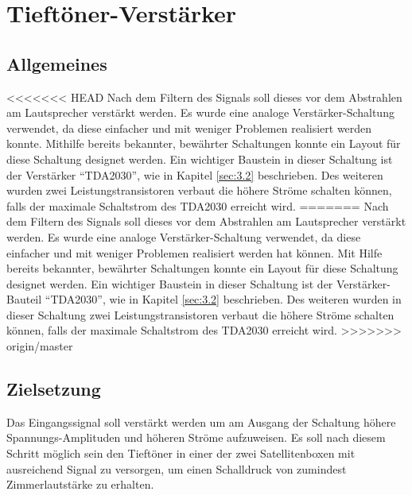 \null\newpage
\section{Tieftöner-Verstärker}\label{sec:5.3}
\subsection{Allgemeines}\label{subsec:5.3.1}
<<<<<<< HEAD
Nach dem Filtern des Signals soll dieses vor dem Abstrahlen am Lautsprecher verstärkt werden. Es wurde eine analoge Verstärker-Schaltung verwendet, da diese einfacher und mit weniger Problemen realisiert werden konnte. Mithilfe bereits bekannter, bewährter Schaltungen konnte ein Layout für diese Schaltung designet werden. Ein wichtiger Baustein in dieser Schaltung ist der Verstärker \enquote{TDA2030}, wie in Kapitel \ref{sec:3.2} beschrieben.  Des weiteren wurden zwei Leistungstransistoren verbaut die höhere Ströme schalten können, falls der maximale Schaltstrom des TDA2030 erreicht wird.
=======
Nach dem Filtern des Signals soll dieses vor dem Abstrahlen am Lautsprecher verstärkt werden. Es wurde eine analoge Verstärker-Schaltung verwendet, da diese einfacher und mit weniger Problemen realisiert werden hat können. Mit Hilfe bereits bekannter, bewährter Schaltungen konnte ein Layout für diese Schaltung designet werden. Ein wichtiger Baustein in dieser Schaltung ist der Verstärker-Bauteil \enquote{TDA2030}, wie in Kapitel \ref{sec:3.2} beschrieben.  Des weiteren wurden in dieser Schaltung zwei Leistungstransistoren verbaut die höhere Ströme schalten können, falls der maximale Schaltstrom des TDA2030 erreicht wird.
>>>>>>> origin/master

\subsection{Zielsetzung}\label{subsec:5.3.2}
Das Eingangssignal soll verstärkt werden um am Ausgang der Schaltung höhere Spannungs-Amplituden und höheren Ströme aufzuweisen. Es soll nach diesem Schritt möglich sein den Tieftöner in einer der zwei Satellitenboxen mit ausreichend Signal zu versorgen, um einen Schalldruck von zumindest Zimmerlautstärke zu erhalten. 

